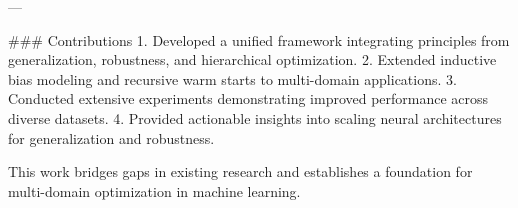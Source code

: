 ---

### Contributions  
1. Developed a unified framework integrating principles from generalization, robustness, and hierarchical optimization.  
2. Extended inductive bias modeling and recursive warm starts to multi-domain applications.  
3. Conducted extensive experiments demonstrating improved performance across diverse datasets.  
4. Provided actionable insights into scaling neural architectures for generalization and robustness.  

This work bridges gaps in existing research and establishes a foundation for multi-domain optimization in machine learning.
